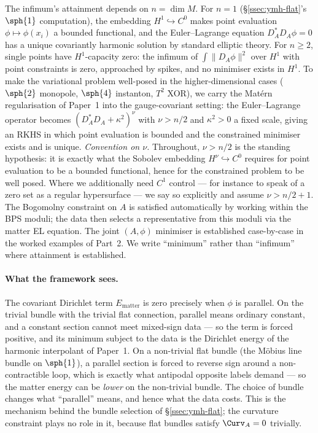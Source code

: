 \begin{remark}\label{rem:ymh-attainment}
The infimum's attainment depends on $n=\dim M$. For $n=1$
(\S\ref{ssec:ymh-flat}'s $\sph{1}$ computation), the embedding
$H^1\hookrightarrow C^0$ makes point evaluation
$\phi\mapsto\phi(x_i)$ a bounded functional, and the
Euler--Lagrange equation $D_A^*D_A\phi=0$ has a unique covariantly
harmonic solution by standard elliptic theory. For $n\geq 2$, single
points have $H^1$-capacity zero: the infimum of $\int\|D_A\phi\|^2$
over $H^1$ with point constraints is zero, approached by spikes, and
no minimiser exists in $H^1$. To make the variational problem
well-posed in the higher-dimensional cases ($\sph{2}$ monopole,
$\sph{4}$ instanton, $T^2$ XOR), we carry the Mat\'ern
regularisation of Paper~1 \cite{Vasii2026Paper1} into the
gauge-covariant setting: the Euler--Lagrange operator becomes
$(D_A^*D_A+\kappa^2)^\nu$ with $\nu>n/2$ and $\kappa^2>0$ a fixed
scale, giving an RKHS in which point evaluation is bounded and the
constrained minimiser exists and is unique. \emph{Convention on
$\nu$.} Throughout, $\nu>n/2$ is the standing hypothesis: it is
exactly what the Sobolev embedding $H^\nu\hookrightarrow C^0$
requires for point evaluation to be a bounded functional, hence for
the constrained problem to be well posed. Where we additionally need
$C^1$ control --- for instance to speak of a zero set as a regular
hypersurface --- we say so explicitly and assume $\nu>n/2+1$. The Bogomolny constraint
on $A$ is satisfied automatically by working within the BPS moduli;
the data then selects a representative from this moduli via the
matter EL equation. The joint $(A,\phi)$ minimiser is established
case-by-case in the worked examples of Part~2. We write ``minimum''
rather than ``infimum'' where attainment is established.
\end{remark}

\paragraph{What the framework sees.} The covariant Dirichlet term
$E_{\mathrm{matter}}$ is zero precisely when $\phi$ is parallel. On
the trivial bundle with the trivial flat connection, parallel means
ordinary constant, and a constant section cannot meet mixed-sign
data --- so the term is forced positive, and its minimum subject to
the data is the Dirichlet energy of the harmonic interpolant of
Paper~1. On a non-trivial flat bundle (the M\"obius line bundle on
$\sph{1}$), a parallel section is forced to reverse sign around a
non-contractible loop, which is exactly what antipodal opposite
labels demand --- so the matter energy can be \emph{lower} on the
non-trivial bundle. The choice of bundle changes what ``parallel''
means, and hence what the data costs. This is the mechanism behind
the bundle selection of \S\ref{ssec:ymh-flat}; the curvature
constraint plays no role in it, because flat bundles satisfy
$\Curv_A=0$ trivially.

